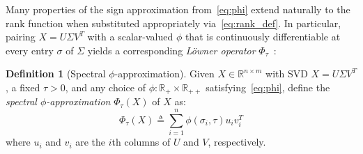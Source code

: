 \documentclass[10pt]{article}
\numberwithin{equation}{section}
\newcommand{\+}{%
	\raisebox{0.18ex}{\scaleobj{0.55}{+}}
}
\theoremstyle{definition}
\newtheorem{definition}{Definition}
\theoremstyle{definition}
\begin{document}
Many properties of the sign approximation from~\eqref{eq:phi} extend naturally to the rank function when substituted appropriately via~\eqref{eq:rank_def}. In particular, pairing $X = U\Sigma V^T$ with a scalar-valued $\phi$ that is continuously differentiable at every entry $\sigma$ of $\Sigma$ yields a corresponding \emph{Löwner operator} $\Phi_\tau$~\cite{bi2013approximation}: 
\begin{definition}[Spectral $\phi$-approximation]
	Given $X \in \mathbb{R}^{n \times m}$ with SVD $X = U \Sigma V^T$, a fixed $\tau > 0$, and any choice of $\phi: \mathbb{R}_+ \times \mathbb{R}_{++}$ satisfying~\eqref{eq:phi}, define the \emph{spectral $\phi$-approximation} $\Phi_\tau(X)$ of $X$ as:
	\begin{equation}\label{def:lowner}%
		\Phi_\tau (X) \triangleq \sum\limits_{i=1}^{n} \phi(\sigma_i, \tau) u_i v_i^T
	\end{equation}
	where $u_i$ and $v_i$ are the $i$th columns of $U$ and $V$, respectively. 
\end{definition}
\end{document}
